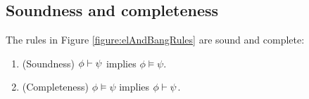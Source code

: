 



\subsection{Soundness and completeness}

\begin{theorem}\label{theorem:elAndBang:soundComplete}
The rules in Figure \ref{figure:elAndBangRules} are sound and complete:
\begin{enumerate}

\item\label{theorem:elAndBang:sound} (Soundness) $\phi \vdash \psi$ implies $\phi \models \psi$.

\item\label{theorem:elAndBang:complete} (Completeness) $\phi \models \psi$ implies $\phi \vdash \psi$.

\end{enumerate}
\end{theorem}




